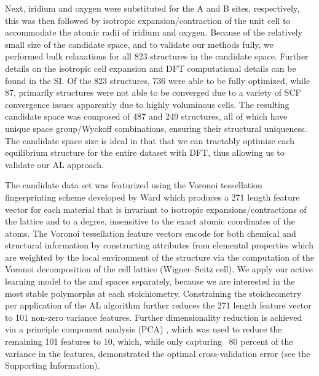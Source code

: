 %
Next, iridium and oxygen were substituted for the A and B sites, respectively,
this was then followed by isotropic expansion/contraction of the unit cell to accommodate the atomic radii of iridium and oxygen.
%
Because of the relatively small size of the candidate space, and to validate our methods fully, we performed bulk relaxations for all \num{823} structures in the candidate space.
%
Further details on the isotropic cell expansion and DFT computational details can be found in the SI.
%
Of the \num{823} structures, \num{736} were able to be fully optimized, while \num{87}, primarily \ABtwo structures were not able to be converged due to a variety of SCF convergence issues apparently due to highly voluminous cells.
%
The resulting candidate space was composed of \num{487} \IrOtwo and \num{249} \IrOthree structures, all of which have unique space group/Wyckoff combinations, ensuring their structural uniqueness.
%
%
The candidate space size is ideal in that that we can tractably optimize each equilibrium structure for the entire dataset with DFT, thus allowing us to validate our AL approach.

%
%
The candidate data set was featurized using the Voronoi tessellation fingerprinting scheme developed by Ward  \cite{Ward2017} which produces a \num{271} length feature vector for each material that is invariant to isotropic expansions/contractions of the lattice and to a degree, insensitive to the exact atomic coordinates of the atoms.
%
The Voronoi tessellation feature vectors encode for both chemical and structural information by constructing attributes from elemental properties which are weighted by the local environment of the structure via the computation of the Voronoi decomposition of the cell lattice (Wigner–Seitz cell).
%
We apply our active learning model to the \IrOtwo and \IrOthree spaces separately, because we are interested in the most stable polymorphs at each stoichiometry.
%
Constraining the stoicheometry per application of the AL algorithm further reduces the \num{271} length  feature vector to \num{101} non-zero variance features.%
%
Further dimensionality reduction is achieved via a principle component analysis (PCA) \cite{Tipping1999}, which was used to reduce the remaining \num{101} features to \num{10}, which, while only capturing ~80 percent of the variance in the features, demonstrated the optimal cross-validation error (see the Supporting Information).

